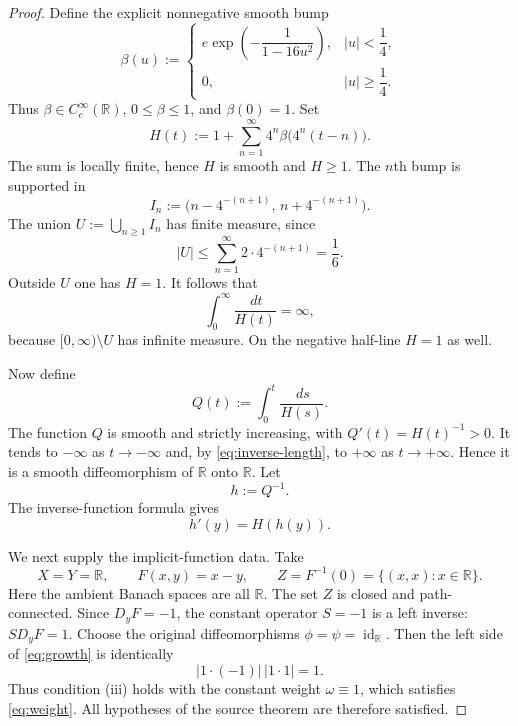 \documentclass[11pt]{article}
\newcommand{\R}{\mathbb R}
\newcommand{\dd}{\,d}
\begin{document}
\begin{proof}
Define the explicit nonnegative smooth bump
\[
 \beta(u):=
 \begin{cases}
   e\exp\!\left(-\dfrac{1}{1-16u^2}\right),&|u|<\dfrac14,\\[6pt]
   0,&|u|\geq\dfrac14.
 \end{cases}
\]
Thus $\beta\in C_c^\infty(\R)$, $0\leq\beta\leq1$, and $\beta(0)=1$.
Set
\begin{equation}
 H(t):=1+\sum_{n=1}^\infty 4^n\beta\bigl(4^n(t-n)\bigr). \label{eq:H}
\end{equation}
The sum is locally finite, hence $H$ is smooth and $H\geq1$.  The $n$th
bump is supported in
\[
 I_n:=\bigl(n-4^{-(n+1)},\,n+4^{-(n+1)}\bigr).
\]
The union $U:=\bigcup_{n\geq1}I_n$ has finite measure, since
\[
 |U|\leq\sum_{n=1}^\infty2\cdot4^{-(n+1)}=\frac16.
\]
Outside $U$ one has $H=1$.  It follows that
\begin{equation}
       \int_0^\infty\frac{\dd t}{H(t)}=\infty,        \label{eq:inverse-length}
\end{equation}
because $[0,\infty)\setminus U$ has infinite measure.  On the negative
half-line $H=1$ as well.

Now define
\[
 Q(t):=\int_0^t\frac{\dd s}{H(s)}.
\]
The function $Q$ is smooth and strictly increasing, with $Q'(t)=H(t)^{-1}>0$.
It tends to $-\infty$ as $t\to-\infty$ and, by
\eqref{eq:inverse-length}, to $+\infty$ as $t\to+\infty$.  Hence it is a
smooth diffeomorphism of $\R$ onto $\R$.  Let
\[
                         h:=Q^{-1}.
\]
The inverse-function formula gives
\begin{equation}
                         h'(y)=H(h(y)).                \label{eq:hprime}
\end{equation}

We next supply the implicit-function data.  Take
\[
 X=Y=\R,\qquad F(x,y)=x-y,\qquad
 Z=F^{-1}(0)=\{(x,x):x\in\R\}.
\]
Here the ambient Banach spaces are all $\R$.  The set $Z$ is closed and
path-connected.  Since $D_yF=-1$, the constant operator $S=-1$ is a left
inverse: $S D_yF=1$.  Choose the original diffeomorphisms
$\phi=\psi=\operatorname{id}_{\R}$.  Then the left side of
\eqref{eq:growth} is identically
\[
       |1\cdot(-1)|\,|1\cdot1|=1.
\]
Thus condition (iii) holds with the constant weight $\omega\equiv1$, which
satisfies \eqref{eq:weight}.  All hypotheses of the source theorem are
therefore satisfied.


\end{proof}
\end{document}

